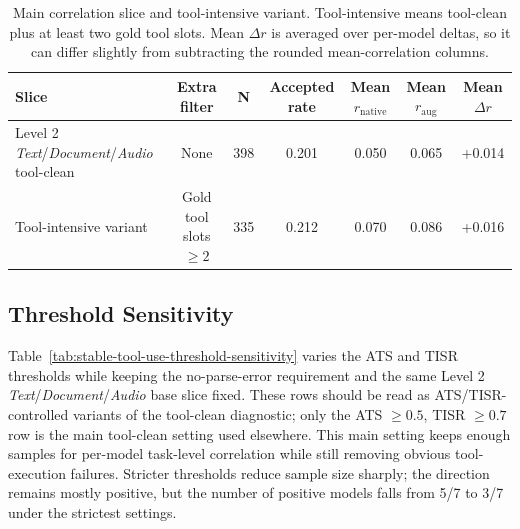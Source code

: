 \documentclass{article}
\begin{document}
\begin{table}[H]
\centering
\scriptsize
\setlength{\tabcolsep}{5.5pt}
\begin{tabular}{lcccccc}
\toprule
Slice & Extra filter & N & Accepted rate & Mean $r_{\mathrm{native}}$ & Mean $r_{\mathrm{aug}}$ & Mean $\Delta r$ \\
\midrule
Level 2 \emph{Text}/\emph{Document}/\emph{Audio} tool-clean & None & 398 & 0.201 & 0.050 & 0.065 & +0.014 \\
Tool-intensive variant & Gold tool slots $\geq 2$ & 335 & 0.212 & 0.070 & 0.086 & +0.016 \\
\bottomrule
\end{tabular}
\vspace{0.05cm}
\caption{Main correlation slice and tool-intensive variant. Tool-intensive means tool-clean plus at least two gold tool slots. Mean $\Delta r$ is averaged over per-model deltas, so it can differ slightly from subtracting the rounded mean-correlation columns.}
\label{tab:tool-density-definition}
\end{table}

\subsection{Threshold Sensitivity}
Table~\ref{tab:stable-tool-use-threshold-sensitivity} varies the ATS and TISR thresholds while keeping the no-parse-error requirement and the same Level 2 \emph{Text}/\emph{Document}/\emph{Audio} base slice fixed. These rows should be read as ATS/TISR-controlled variants of the tool-clean diagnostic; only the ATS $\ge 0.5$, TISR $\ge 0.7$ row is the main tool-clean setting used elsewhere. This main setting keeps enough samples for per-model task-level correlation while still removing obvious tool-execution failures. Stricter thresholds reduce sample size sharply; the direction remains mostly positive, but the number of positive models falls from 5/7 to 3/7 under the strictest settings.
\end{document}
